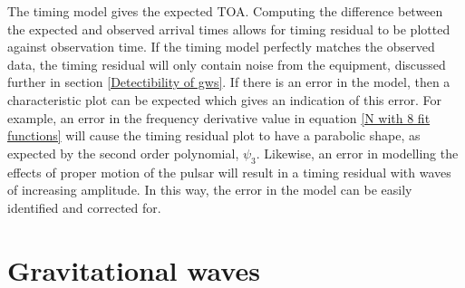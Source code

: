 \documentclass[12pt]{article}
\begin{document}
	\noindent The timing model gives the expected TOA. Computing the difference between the expected and observed arrival times allows for timing residual to be plotted against observation time. If the timing model perfectly matches the observed data, the timing residual will only contain noise from the equipment, discussed further in section \ref{Detectibility of gws}. If there is an error in the model, then a characteristic plot can be expected which gives an indication of this error. For example, an error in the frequency derivative value in equation \ref{N with 8 fit functions} will cause the timing residual plot to have a parabolic shape, as expected by the second order polynomial, $\psi_3$. Likewise, an error in modelling the effects of proper motion of the pulsar will result in a timing residual with waves of increasing amplitude. In this way, the error in the model can be easily identified and corrected for. 

	\section{Gravitational waves}
	
\end{document}
